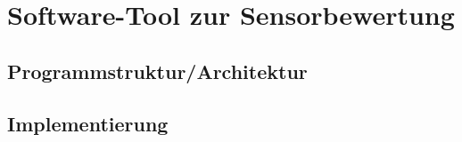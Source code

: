 \section{Software-Tool zur Sensorbewertung}
\label{sec:Software-Tool}

\subsection{Programmstruktur/Architektur}
\label{sec:Programmstruktur}

\subsection{Implementierung}
\label{sec:Implementierung}